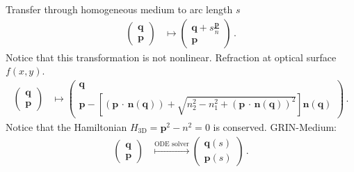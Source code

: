 \documentclass[12pt,a4paper,twoside,openright,BCOR10mm,headsepline,titlepage,abstracton,chapterprefix,final]{scrreprt}
\newcommand\Vector[1]{{\mathbf{#1}}}
\newcommand{\scpm}[2]{(#1\,\cdot\,#2)}
\begin{document}
Transfer through homogeneous medium to arc length $s$
\begin{align}
 \begin{pmatrix}
  \Vector{q} \\
  \Vector{p}
 \end{pmatrix} &\mapsto
 \begin{pmatrix}
  \Vector{q} + s \frac{\Vector{p}}{n} \\
  \Vector{p}
 \end{pmatrix}\,.
\end{align}
Notice that this transformation is not nonlinear.
Refraction at optical surface $f(x,y)$.
\begin{align}
 \begin{pmatrix}
  \Vector{q} \\
  \Vector{p}
 \end{pmatrix} &\mapsto
 \begin{pmatrix}
  \Vector{q} \\
  \Vector{p} - \left[\scpm{\Vector{p}}{\Vector{n}(\Vector{q})} + \sqrt{n_2^2 - n_1^2 + \scpm{\Vector{p}}{\Vector{n}(\Vector{q})}^2}\right] \Vector{n}(\Vector{q})
 \end{pmatrix}\,.
\end{align}
Notice that the Hamiltonian $H_\text{3D} = \Vector{p}^2 - n^2 = 0$ is conserved.
GRIN-Medium:
\begin{align}
 \begin{pmatrix}
  \Vector{q} \\
  \Vector{p}
 \end{pmatrix} &\stackrel{\text{ODE solver}}{\mapsto}
 \begin{pmatrix}
  \Vector{q}(s) \\
  \Vector{p}(s)
 \end{pmatrix}\,.
\end{align}
\end{document}
